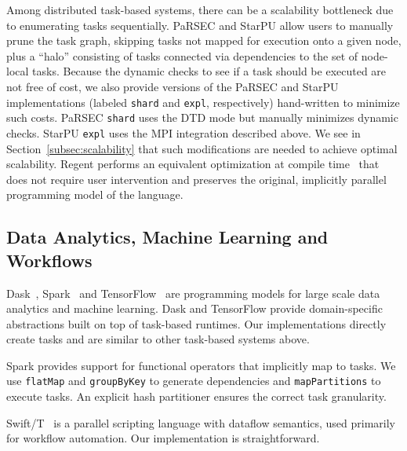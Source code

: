 Among distributed task-based systems, there can be a scalability
bottleneck due to enumerating tasks sequentially. PaRSEC and StarPU
allow users to manually prune the task graph, skipping tasks not
mapped for execution onto a given node, plus a ``halo'' consisting of
tasks connected via dependencies to the set of node-local tasks. Because the dynamic
checks to see if a task should be executed are not free of cost, we
also provide versions of the PaRSEC and StarPU implementations
(labeled \lstinline{shard} and \lstinline{expl}, respectively)
hand-written to minimize such costs. PaRSEC \lstinline{shard} uses the
DTD mode but manually minimizes dynamic checks. StarPU
\lstinline{expl} uses the MPI integration described above. We see in
Section~\ref{subsec:scalability} that such modifications are needed to
achieve optimal scalability. Regent performs an equivalent
optimization at compile time~\cite{ControlReplication17} that does not
require user intervention and preserves the original, implicitly
parallel programming model of the language.



\subsection{Data Analytics, Machine Learning and Workflows}

Dask~\cite{Dask15}, Spark~\cite{Spark10} and
TensorFlow~\cite{TensorFlow15} are programming models for large scale
data analytics and machine learning. Dask and TensorFlow provide
domain-specific abstractions built on top of task-based runtimes. Our
implementations directly create tasks and are similar to other
task-based systems above.

Spark provides support for functional operators that implicitly map to
tasks. We use \lstinline[language=Scala]{flatMap} and
\lstinline[language=Scala]{groupByKey} to generate dependencies and
\lstinline[language=Scala]{mapPartitions} to execute tasks. An
explicit hash partitioner ensures the correct task granularity.

Swift/T~\cite{Wozniak13} is a parallel scripting language
with dataflow semantics, used primarily for workflow automation. Our
implementation is straightforward.
